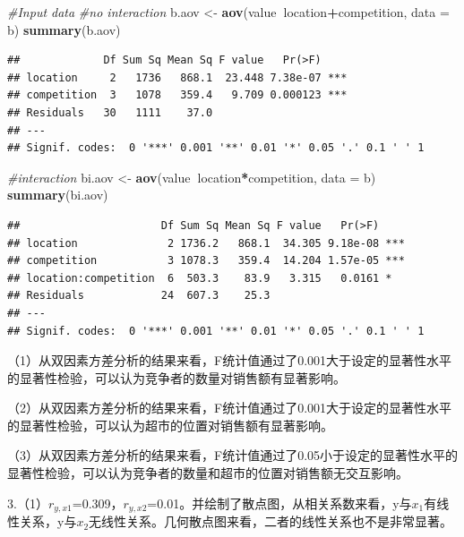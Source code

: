 \documentclass[]{ctexbook}
\newenvironment{Shaded}{\begin{snugshade}}{\end{snugshade}}
\newcommand{\CommentTok}[1]{\textcolor[rgb]{0.56,0.35,0.01}{\textit{#1}}}
\newcommand{\DataTypeTok}[1]{\textcolor[rgb]{0.13,0.29,0.53}{#1}}
\newcommand{\KeywordTok}[1]{\textcolor[rgb]{0.13,0.29,0.53}{\textbf{#1}}}
\newcommand{\NormalTok}[1]{#1}
\newcommand{\OperatorTok}[1]{\textcolor[rgb]{0.81,0.36,0.00}{\textbf{#1}}}
\newcommand{\StringTok}[1]{\textcolor[rgb]{0.31,0.60,0.02}{#1}}
\begin{document}
\begin{Shaded}
\begin{Highlighting}[]
\CommentTok{#Input data}
\CommentTok{#no interaction}
\NormalTok{b.aov <-}\StringTok{ }\KeywordTok{aov}\NormalTok{(value}\OperatorTok{~}\NormalTok{location}\OperatorTok{+}\NormalTok{competition, }\DataTypeTok{data =}\NormalTok{ b)}
\KeywordTok{summary}\NormalTok{(b.aov)}
\end{Highlighting}
\end{Shaded}

\begin{verbatim}
##             Df Sum Sq Mean Sq F value   Pr(>F)    
## location     2   1736   868.1  23.448 7.38e-07 ***
## competition  3   1078   359.4   9.709 0.000123 ***
## Residuals   30   1111    37.0                     
## ---
## Signif. codes:  0 '***' 0.001 '**' 0.01 '*' 0.05 '.' 0.1 ' ' 1
\end{verbatim}

\begin{Shaded}
\begin{Highlighting}[]
\CommentTok{#interaction}
\NormalTok{bi.aov <-}\StringTok{ }\KeywordTok{aov}\NormalTok{(value}\OperatorTok{~}\NormalTok{location}\OperatorTok{*}\NormalTok{competition, }\DataTypeTok{data =}\NormalTok{ b)}
\KeywordTok{summary}\NormalTok{(bi.aov)}
\end{Highlighting}
\end{Shaded}

\begin{verbatim}
##                      Df Sum Sq Mean Sq F value   Pr(>F)    
## location              2 1736.2   868.1  34.305 9.18e-08 ***
## competition           3 1078.3   359.4  14.204 1.57e-05 ***
## location:competition  6  503.3    83.9   3.315   0.0161 *  
## Residuals            24  607.3    25.3                     
## ---
## Signif. codes:  0 '***' 0.001 '**' 0.01 '*' 0.05 '.' 0.1 ' ' 1
\end{verbatim}

（1）从双因素方差分析的结果来看，F统计值通过了0.001大于设定的显著性水平的显著性检验，可以认为竞争者的数量对销售额有显著影响。

（2）从双因素方差分析的结果来看，F统计值通过了0.001大于设定的显著性水平的显著性检验，可以认为超市的位置对销售额有显著影响。

（3）从双因素方差分析的结果来看，F统计值通过了0.05小于设定的显著性水平的显著性检验，可以认为竞争者的数量和超市的位置对销售额无交互影响。

3.（1）\(r_{y,x1}\)=0.309，\(r_{y,x2}\)=0.01。并绘制了散点图，从相关系数来看，y与\(x_1\)有线性关系，y与\(x_2\)无线性关系。几何散点图来看，二者的线性关系也不是非常显著。
\end{document}
